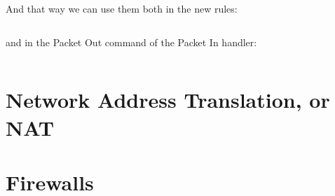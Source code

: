 And that way we can use them both in the new rules:

\inputminted[firstline=54,lastline=68]{python}{code/routing_variants/load_balancer_handler2.py} 

and in the Packet Out command of the Packet In handler:

\inputminted[firstline=87]{python}{code/routing_variants/load_balancer_handler2.py} 

\section{Network Address Translation, or NAT}

\section{Firewalls}

